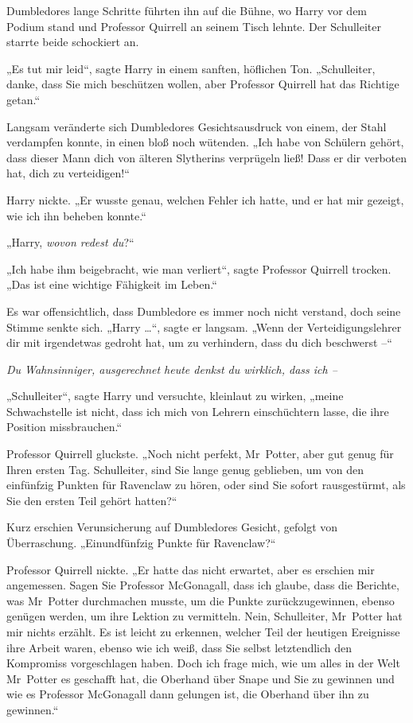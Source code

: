 {Dumbledores lange Schritte führten ihn auf die Bühne, wo Harry vor dem Podium stand und Professor Quirrell an seinem Tisch lehnte. Der Schulleiter starrte beide schockiert an.

„Es tut mir leid“, sagte Harry in einem sanften, höflichen Ton. „Schulleiter, danke, dass Sie mich beschützen wollen, aber Professor Quirrell hat das Richtige getan.“

Langsam veränderte sich Dumbledores Gesichtsausdruck von einem, der Stahl verdampfen konnte, in einen bloß noch wütenden. „Ich habe von Schülern gehört, dass dieser Mann dich von älteren Slytherins verprügeln ließ! Dass er dir verboten hat, dich zu verteidigen!“

Harry nickte. „Er wusste genau, welchen Fehler ich hatte, und er hat mir gezeigt, wie ich ihn beheben konnte.“

„Harry, \emph{wovon redest du}?“

„Ich habe ihm beigebracht, wie man verliert“, sagte Professor Quirrell trocken. „Das ist eine wichtige Fähigkeit im Leben.“

Es war offensichtlich, dass Dumbledore es immer noch nicht verstand, doch seine Stimme senkte sich. „Harry …“, sagte er langsam. „Wenn der Verteidigungslehrer dir mit irgendetwas gedroht hat, um zu verhindern, dass du dich beschwerst --“

\emph{Du Wahnsinniger, ausgerechnet heute denkst du wirklich, dass ich --}

„Schulleiter“, sagte Harry und versuchte, kleinlaut zu wirken, „meine Schwachstelle ist nicht, dass ich mich von Lehrern einschüchtern lasse, die ihre Position missbrauchen.“

Professor Quirrell gluckste. „Noch nicht perfekt, Mr~Potter, aber gut genug für Ihren ersten Tag. Schulleiter, sind Sie lange genug geblieben, um von den einfünfzig Punkten für Ravenclaw zu hören, oder sind Sie sofort rausgestürmt, als Sie den ersten Teil gehört hatten?“

Kurz erschien Verunsicherung auf Dumbledores Gesicht, gefolgt von Überraschung. „Einundfünfzig Punkte für Ravenclaw?“

Professor Quirrell nickte. „Er hatte das nicht erwartet, aber es erschien mir angemessen. Sagen Sie Professor McGonagall, dass ich glaube, dass die Berichte, was Mr~Potter durchmachen musste, um die Punkte zurückzugewinnen, ebenso genügen werden, um ihre Lektion zu vermitteln. Nein, Schulleiter, Mr~Potter hat mir nichts erzählt. Es ist leicht zu erkennen, welcher Teil der heutigen Ereignisse ihre Arbeit waren, ebenso wie ich weiß, dass Sie selbst letztendlich den Kompromiss vorgeschlagen haben. Doch ich frage mich, wie um alles in der Welt Mr~Potter es geschafft hat, die Oberhand über Snape und Sie zu gewinnen und wie es Professor McGonagall dann gelungen ist, die Oberhand über ihn zu gewinnen.“

}
